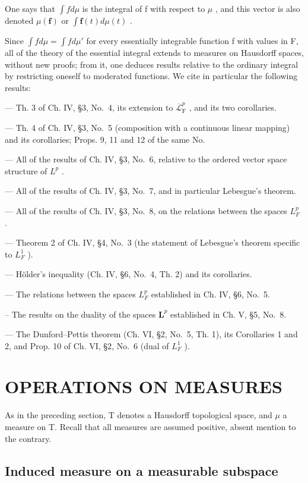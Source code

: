 One says that \(\int f d\mu\) is the integral of f with respect to \(\mu\) , and this vector is also denoted \(\mu(\mathbf{f})\) or \(\int \mathbf{f}(t) d\mu(t)\) .

Since \(\int f d\mu = \int f d\mu'\) for every essentially integrable function f with values in F, all of the theory of the essential integral extends to measures on Hausdorff spaces, without new proofs; from it, one deduces results relative to the ordinary integral by restricting oneself to moderated functions. We cite in particular the following results:

--- Th. 3 of Ch. IV, §3, No.~4, its extension to \(\overline{\mathcal{L}}_{\mathrm{F}}^{p}\) , and its two corollaries.

--- Th. 4 of Ch. IV, §3, No.~5 (composition with a continuous linear mapping) and its corollaries; Props. 9, 11 and 12 of the same No.

--- All of the results of Ch. IV, §3, No.~6, relative to the ordered vector space structure of \(L^{p}\) .

--- All of the results of Ch. IV, §3, No.~7, and in particular Lebesgue's theorem.

--- All of the results of Ch. IV, §3, No.~8, on the relations between the spaces \(L_F^p\) .

--- Theorem 2 of Ch. IV, §4, No.~3 (the statement of Lebesgue's theorem specific to \(L_F^1\) ).

--- Hölder's inequality (Ch. IV, §6, No.~4, Th. 2) and its corollaries.

--- The relations between the spaces \(L_{F}^{p}\) established in Ch. IV, §6, No.~5.

-- The results on the duality of the spaces \(\mathbf{L}^p\) established in Ch. V, §5, No.~8.

--- The Dunford--Pettis theorem (Ch. VI, §2, No.~5, Th. 1), its Corollaries 1 and 2, and Prop. 10 of Ch. VI, §2, No.~6 (dual of \(L_{F}^{1}\) ).

\section{OPERATIONS ON MEASURES}

As in the preceding section, T denotes a Hausdorff topological space, and \(\mu\) a measure on T. Recall that all measures are assumed positive, absent mention to the contrary.

\subsection{Induced measure on a measurable subspace}

